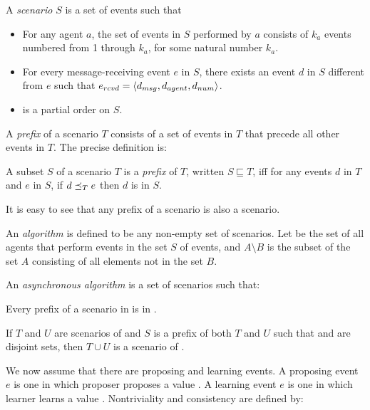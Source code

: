 \begin{asyncdef}[Scenario]
    A \emph{scenario} $S$ is a set of events such that
    \begin{itemize}
        \item For any agent $a$, the set of events in $S$ performed by $a$ consists of $k_a$ events numbered from 1 through $k_a$, for some natural number $k_a$.
        \item For every message-receiving event $e$ in $S$, there exists an event $d$ in $S$ different from $e$ such that $e_{rcvd} = \langle d_{msg}, d_{agent}, d_{num} \rangle$.
        \item \preceqS is a partial order on $S$.
    \end{itemize}
\end{asyncdef}

A \emph{prefix} of a scenario $T$ consists of a set of events in $T$ that precede all other events in $T$.
The precise definition is:

\begin{asyncdef}[Prefix]
    A subset $S$ of a scenario $T$ is a \emph{prefix} of $T$, written $S \sqsubseteq T$, iff for any events $d$ in $T$ and $e$ in $S$, if $d \preceq_{T} e$ then $d$ is in $S$.
\end{asyncdef}

It is easy to see that any prefix of a scenario is also a scenario.

An \emph{algorithm} is defined to be any non-empty set of scenarios.
Let  be the set of all agents that perform events in the set $S$ of events, and $A\setminus B$ is the subset of the set $A$ consisting of all elements not in the set $B$.

\begin{asyncdef}
    An \emph{asynchronous algorithm} \Alg is a set of scenarios such that:

    \begin{algorithmdef}
        Every prefix of a scenario in \Alg is in \Alg.
    \end{algorithmdef}
    \begin{algorithmdef}
        If $T$ and $U$ are scenarios of \Alg and $S$ is a prefix of both $T$ and $U$ such that  and  are disjoint sets, then $T \cup U$ is a scenario of \Alg.
    \end{algorithmdef}
\end{asyncdef}

We now assume that there are proposing and learning events.
A proposing event $e$ is one in which proposer  proposes a value .
A learning event $e$ is one in which learner  learns a value .
Nontriviality and consistency are defined by:

